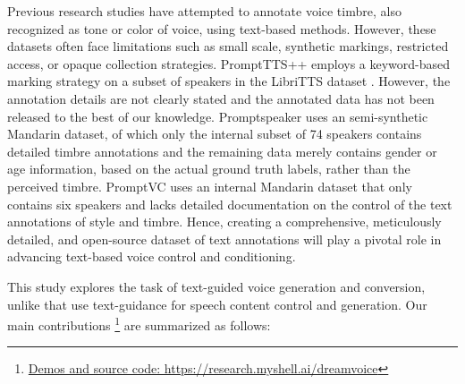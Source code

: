 \documentclass{Interspeech2024}
\begin{document}
Previous research studies \cite{yao2023promptvc, shimizu2023prompttts++, zhang2023promptspeaker} have attempted to annotate voice timbre, also recognized as tone or color of voice, using text-based methods. However, these datasets often face limitations such as small scale, synthetic markings, restricted access, or opaque collection strategies. PromptTTS++ \cite{shimizu2023prompttts++} employs a keyword-based marking strategy on a subset of speakers in the LibriTTS dataset \cite{koizumi2023libritts}. However, the annotation details are not clearly stated and the annotated data has not been released to the best of our knowledge.
Promptspeaker \cite{zhang2023promptspeaker} uses an semi-synthetic Mandarin dataset, of which only the internal subset of 74 speakers contains detailed timbre annotations and the remaining data merely contains gender or age information, based on the actual ground truth labels, rather than the perceived timbre.
PromptVC \cite{yao2023promptvc} uses an internal Mandarin dataset that only contains six speakers and lacks detailed documentation on the control of the text annotations of style and timbre. 
Hence, creating a comprehensive, meticulously detailed, and open-source dataset of text annotations will play a pivotal role in advancing text-based voice control and conditioning.





This study explores the task of text-guided voice generation and conversion, unlike \cite{yao2023promptvc, shimizu2023prompttts++} that use text-guidance for speech content control and generation. Our main contributions \footnote{\href {}{Demos and source code: https://research.myshell.ai/dreamvoice}} are summarized as follows:
\end{document}
